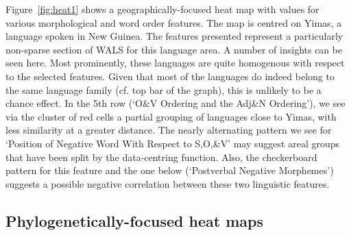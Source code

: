 \documentclass[11pt]{article}
\begin{document}
Figure~\ref{fig:heat1} shows a geographically-focused heat map with values for various morphological and word order features. The map is centred on Yimas, a language spoken in New Guinea. The features presented represent a particularly non-sparse section of WALS for this language area. A number of insights can be seen here. Most prominently, these languages are quite homogenous with respect to the selected features. Given that most of the languages do indeed belong to the same language family (cf. top bar of the graph), this is unlikely to be a chance effect.  In the 5th row (`O\&V Ordering and the Adj\&N Ordering'), we see via the cluster of red cells a partial grouping of languages close to Yimas, with less similarity at a greater distance. The nearly alternating pattern we see for `Position of Negative Word With Respect to S,O,\&V' may suggest areal groups that have been split by the data-centring function. Also, the checkerboard pattern for this feature and the one below (`Postverbal Negative Morphemes') suggests a possible negative correlation between these two linguistic features.



\subsection{Phylogenetically-focused heat maps}
\end{document}

